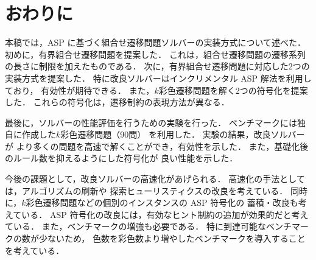 ﻿%
\section{おわりに}\label{chap:conclusion}

本稿では，ASP に基づく組合せ遷移問題ソルバーの実装方式について述べた．
初めに，有界組合せ遷移問題を提案した．
これは，組合せ遷移問題の遷移系列の長さに制限を加えたものである．
次に，有界組合せ遷移問題に対応した2つの実装方式を提案した．
特に改良ソルバーはインクリメンタル ASP 解法を利用しており，
有効性が期待できる．
また，$k$彩色遷移問題を解く2つの符号化を提案した．
これらの符号化は，遷移制約の表現方法が異なる．

最後に，ソルバーの性能評価を行うための実験を行った．
ベンチマークには独自に作成した$k$彩色遷移問題（90問）
を利用した．
実験の結果，改良ソルバーが
より多くの問題を高速で解くことができ，有効性を示した．
また，基礎化後のルール数を抑えるようにした符号化が
良い性能を示した．

今後の課題として，改良ソルバーの高速化があげられる．
高速化の手法としては，アルゴリズムの刷新や
探索ヒューリスティクスの改良を考えている．
同時に，$k$彩色遷移問題などの個別のインスタンスの ASP 符号化の
蓄積・改良も考えている．
ASP 符号化の改良には，有効なヒント制約の追加が効果的だと考えている．
また，ベンチマークの増強も必要である．
特に到達可能なベンチマークの数が少ないため，
色数を彩色数より増やしたベンチマークを導入することを考えている．

%


